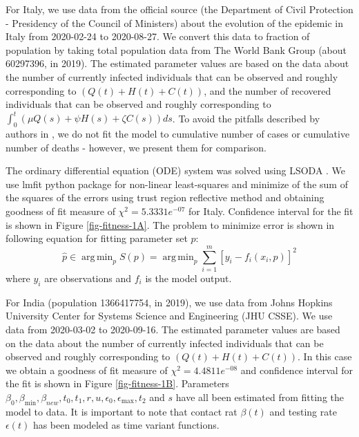 \documentclass[authoryear,preprint]{elsarticle}
\DeclareMathOperator*{\argmin}{arg\,min}
\begin{document}
For Italy, we use data from the official source (the Department of Civil Protection - Presidency of the Council of Ministers) about the evolution of the epidemic in Italy from 2020-02-24 to 2020-08-27. We convert this data to fraction of population by taking total population data from The World Bank Group (about 60297396, in 2019). The estimated parameter values are based on the data about the number of currently infected individuals that can be observed and roughly corresponding to $\left( Q(t) + H(t) + C(t)\right) $, and the number of recovered individuals that can be observed and roughly corresponding to $\int_{0}^{t}{\left( \mu Q(s) + \psi H(s) + \zeta  C(s) \right) ds}$. To avoid the pitfalls described by authors in \cite{doi:10.1098/rspb.2015.0347}, we do not fit the model to cumulative number of cases or cumulative number of deaths - however, we present them for comparison.

The ordinary differential equation (ODE) system was solved using LSODA \cite{doi:10.1137/0904010, HindmarshSep2005}. We use lmfit python package \cite{LMFIT} for non-linear least-squares and minimize of the sum of the squares of the errors using trust region reflective method and obtaining goodness of fit measure of $\chi^2= 5.3331e^{-07}$ for Italy. Confidence interval for the fit is shown in Figure \ref{fig-fitness-1A}. The problem to minimize error is shown in following equation for fitting parameter set $p$:
%
\begin{equation}
\hat{p} \in \argmin_p S(p) =  \argmin_p \sum_{i=1}^{m}{\left[y_i - f_i(x_i,p)\right]^2 }
\end{equation}
%
where $y_i$ are observations and $f_i$ is the model output.

For India (population 1366417754, in 2019), we use data from Johns Hopkins University Center for Systems Science and Engineering (JHU CSSE). We use data from 2020-03-02 to 2020-09-16. The estimated parameter values are based on the data about the number of currently infected individuals that can be observed and roughly corresponding to $\left( Q(t) + H(t) + C(t)\right) $. In this case we obtain a goodness of fit measure of $\chi^2= 4.4811e^{-08}$ and confidence interval for the fit is shown in Figure \ref{fig-fitness-1B}. Parameters $\beta_0, \beta_{\min}, \beta_{new}, t_0, t_1, r, u, \epsilon_0, \epsilon_{\max}, t_2$ and $s$ have all been estimated from fitting the model to data. It is important to note that contact rat $\beta(t)$ and testing rate $\epsilon(t)$ has been modeled as time variant functions.
\end{document}

